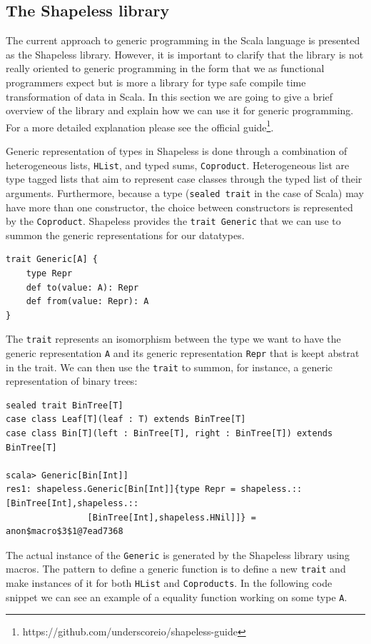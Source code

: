 \documentclass[a4paper]{article}
\newcommand{\scala}[1]{\lstinline[basicstyle=\ttfamily\color{white},style=scala]|#1|}
\begin{document}
\subsection{The Shapeless library}

The current approach to generic programming in the Scala language is presented as the Shapeless library. However, it is important to clarify that the library is not really oriented to generic programming in the form that we as functional programmers expect but is more a library for type safe compile time transformation of data in Scala. In this section we are going to give a brief overview of the library and explain how we can use it for generic programming. For a more detailed explanation please see the official guide\footnote{https://github.com/underscoreio/shapeless-guide}.

Generic representation of types in Shapeless is done through a combination of heterogeneous lists, \scala{HList}, and typed sums, \scala{Coproduct}. Heterogeneous list are type tagged lists that aim to represent case classes through the typed list of their arguments. Furthermore, because a type (\scala{sealed trait} in the case of Scala) may have more than one constructor, the choice between constructors is represented by the \scala{Coproduct}. Shapeless provides the \scala{trait Generic} that we can use to summon the generic representations for our datatypes. 

\begin{lstlisting}[style=scala]
trait Generic[A] {
	type Repr
	def to(value: A): Repr
	def from(value: Repr): A
}
\end{lstlisting}

The \scala{trait} represents an isomorphism between the type we want to have the generic representation \scala{A} and its generic representation \scala{Repr} that is keept abstrat in the trait. We can then use the \scala{trait} to summon, for instance, a generic representation of binary trees:

\begin{lstlisting}[style=scala]
sealed trait BinTree[T]
case class Leaf[T](leaf : T) extends BinTree[T]
case class Bin[T](left : BinTree[T], right : BinTree[T]) extends BinTree[T]

scala> Generic[Bin[Int]]
res1: shapeless.Generic[Bin[Int]]{type Repr = shapeless.::[BinTree[Int],shapeless.::
				[BinTree[Int],shapeless.HNil]]} = anon$macro$3$1@7ead7368
\end{lstlisting}

The actual instance of the \scala{Generic} is generated by the Shapeless library using macros. The pattern to define a generic function is to define a new \scala{trait} and make instances of it for both \scala{HList} and \scala{Coproducts}. In the following code snippet we can see an example of a equality function working on some type \scala{A}.
\end{document}

